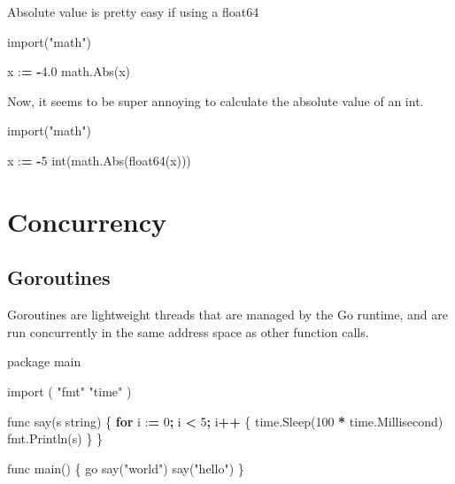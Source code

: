 \documentclass[]{book}
\newenvironment{Shaded}{\begin{snugshade}}{\end{snugshade}}
\newcommand{\DecValTok}[1]{\textcolor[rgb]{0.00,0.00,0.81}{#1}}
\newcommand{\FloatTok}[1]{\textcolor[rgb]{0.00,0.00,0.81}{#1}}
\newcommand{\StringTok}[1]{\textcolor[rgb]{0.31,0.60,0.02}{#1}}
\newcommand{\ImportTok}[1]{#1}
\newcommand{\ControlFlowTok}[1]{\textcolor[rgb]{0.13,0.29,0.53}{\textbf{#1}}}
\newcommand{\OperatorTok}[1]{\textcolor[rgb]{0.81,0.36,0.00}{\textbf{#1}}}
\newcommand{\BuiltInTok}[1]{#1}
\newcommand{\NormalTok}[1]{#1}
\begin{document}
Absolute value is pretty easy if using a float64

\begin{Shaded}
\begin{Highlighting}[]
\ImportTok{import}\NormalTok{(}\StringTok{"math"}\NormalTok{)}

\NormalTok{x :}\OperatorTok{=} \OperatorTok{-}\FloatTok{4.0}
\NormalTok{math.Abs(x)}
\end{Highlighting}
\end{Shaded}

Now, it seems to be super annoying to calculate the absolute value of an
int.

\begin{Shaded}
\begin{Highlighting}[]
\ImportTok{import}\NormalTok{(}\StringTok{"math"}\NormalTok{)}

\NormalTok{x :}\OperatorTok{=} \OperatorTok{-}\DecValTok{5}
\BuiltInTok{int}\NormalTok{(math.Abs(float64(x)))}
\end{Highlighting}
\end{Shaded}

\section{Concurrency}\label{concurrency}

\subsection{Goroutines}\label{goroutines}

Goroutines are lightweight threads that are managed by the Go runtime,
and are run concurrently in the same address space as other function
calls.

\begin{Shaded}
\begin{Highlighting}[]
\NormalTok{package main}

\ImportTok{import}\NormalTok{ (}
    \StringTok{"fmt"}
    \StringTok{"time"}
\NormalTok{)}

\NormalTok{func say(s string) \{}
    \ControlFlowTok{for}\NormalTok{ i :}\OperatorTok{=} \DecValTok{0}\OperatorTok{;}\NormalTok{ i }\OperatorTok{<} \DecValTok{5}\OperatorTok{;}\NormalTok{ i}\OperatorTok{++}\NormalTok{ \{}
\NormalTok{        time.Sleep(}\DecValTok{100} \OperatorTok{*}\NormalTok{ time.Millisecond)}
\NormalTok{        fmt.Println(s)}
\NormalTok{    \}}
\NormalTok{\}}

\NormalTok{func main() \{}
\NormalTok{    go say(}\StringTok{"world"}\NormalTok{)}
\NormalTok{    say(}\StringTok{"hello"}\NormalTok{)}
\NormalTok{\}}
\end{Highlighting}
\end{Shaded}
\end{document}

